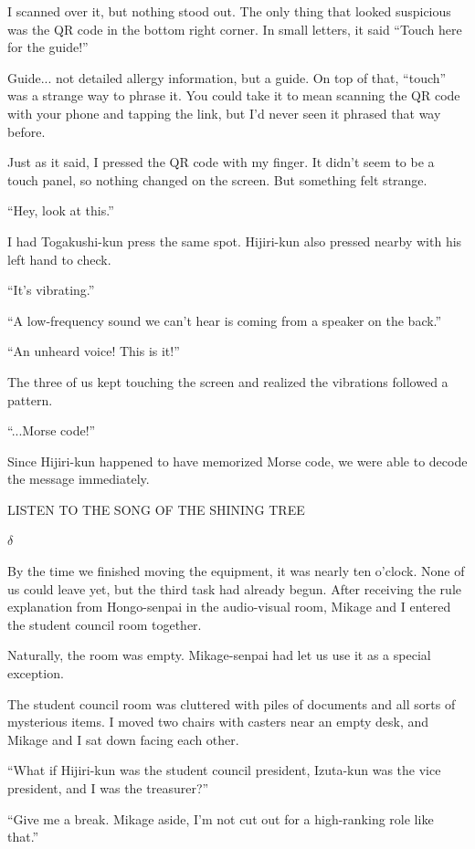 \documentclass[
    a4paper,
    12pt,
    twoside,
    openany,
    UTF8,
    fontset=windows
]{ctexbook}
\begin{document}
I scanned over it, but nothing stood out. The only thing that looked suspicious was the QR code in the bottom right corner. In small letters, it said ``Touch here for the guide!''

Guide... not detailed allergy information, but a guide. On top of that, ``touch'' was a strange way to phrase it. You could take it to mean scanning the QR code with your phone and tapping the link, but I'd never seen it phrased that way before.

Just as it said, I pressed the QR code with my finger. It didn't seem to be a touch panel, so nothing changed on the screen. But something felt strange.

``Hey, look at this.''

I had Togakushi-kun press the same spot. Hijiri-kun also pressed nearby with his left hand to check.

``It's vibrating.''

``A low-frequency sound we can't hear is coming from a speaker on the back.''

``An unheard voice! This is it!''

The three of us kept touching the screen and realized the vibrations followed a pattern.

``...Morse code!''

Since Hijiri-kun happened to have memorized Morse code, we were able to decode the message immediately.

\begin{center}
LISTEN TO THE SONG OF THE SHINING TREE
\end{center}

$\delta$

By the time we finished moving the equipment, it was nearly ten o'clock. None of us could leave yet, but the third task had already begun. After receiving the rule explanation from Hongo-senpai in the audio-visual room, Mikage and I entered the student council room together.

Naturally, the room was empty. Mikage-senpai had let us use it as a special exception.

The student council room was cluttered with piles of documents and all sorts of mysterious items. I moved two chairs with casters near an empty desk, and Mikage and I sat down facing each other.

``What if Hijiri-kun was the student council president, Izuta-kun was the vice president, and I was the treasurer?''

``Give me a break. Mikage aside, I'm not cut out for a high-ranking role like that.''
\end{document}
